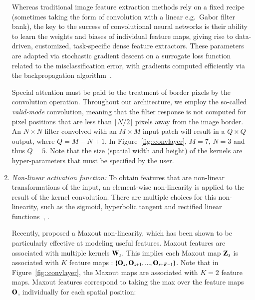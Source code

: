 \documentclass[final,5p,times,twocolumn]{elsarticle}
\begin{document}
\begin{enumerate}
Whereas traditional image feature extraction methods rely on a fixed recipe (sometimes taking the form of convolution with a linear e.g.\ Gabor filter bank), the key to the success of convolutional neural networks is their ability to learn the weights and biases of individual feature maps, giving rise to data-driven, customized, task-specific dense feature extractors. These parameters are adapted via stochastic gradient descent on a surrogate loss function related to the misclassification error, with gradients computed efficiently via the backpropagation algorithm~\citep{rumelhart1988learning}.

Special attention must be paid to the treatment of border pixels by the convolution operation. Throughout our architecture, we employ the so-called \textit{valid-mode} convolution, meaning that the filter response is not computed for pixel positions that are less than $\lfloor N/2\rfloor$ pixels away from the image border. An $N\times N$ filter convolved with an $M\times M$ input patch will result in a $Q \times Q$ output, where $Q = M - N + 1$. In Figure~\ref{fig::convlayer}, $M = 7$, $N = 3$ and thus $Q = 5$. 
Note that the size (spatial width and height) of the kernels are hyper-parameters that must be specified by the user. %

%



\item {\it Non-linear activation function:} To obtain features that are non-linear transformations of the input, an element-wise non-linearity is applied to the result of the kernel convolution. There are multiple choices for this non-linearity, such as the sigmoid, hyperbolic tangent and rectified linear functions~\citep{jarrett2009}, \citep{glorot2011}. %

Recently, \citet{Goodfellow_maxout_2013} proposed a Maxout non-linearity, which has been shown to be particularly effective at modeling useful features. Maxout features are associated with multiple kernels ${\bf W}_{s}$.  This implies each Maxout map ${\bf Z}_{s}$ is associated with $K$ feature maps : $\left \{ {\bf O}_s, {\bf O}_{s+1},...,{\bf O}_{s+K-1} \right \}$. Note that in Figure~\ref{fig::convlayer}, the Maxout maps are associated with $K = 2$ feature maps.  Maxout features correspond to taking the max over the feature maps ${\bf O}$, individually for each spatial position:


\end{enumerate}
\end{document}
